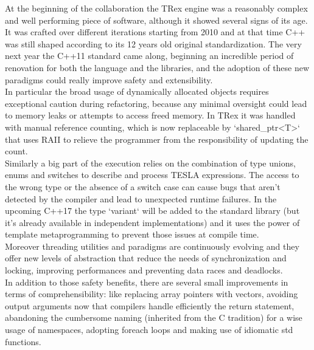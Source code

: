 At the beginning of the collaboration the TRex engine was a reasonably complex and well performing piece of software, although it showed several signs of its age. It was crafted over different iterations starting from 2010 and at that time C++ was still shaped according to its 12 years old original standardization. The very next year the C++11 standard came along, beginning an incredible period of renovation for both the language and the libraries, and the adoption of these new paradigms could really improve safety and extensibility.\\
In particular the broad usage of dynamically allocated objects requires exceptional caution during refactoring, because any minimal oversight could lead to memory leaks or attempts to access freed memory. In TRex it was handled with manual reference counting, which is now replaceable by `shared_ptr<T>` that uses RAII to relieve the programmer from the responsibility of updating the count.\\
Similarly a big part of the execution relies on the combination of type unions, enums and switches to describe and process TESLA expressions. The access to the wrong type or the absence of a switch case can cause bugs that aren't detected by the compiler and lead to unexpected runtime failures. In the upcoming C++17 the type `variant` will be added to the standard library (but it's already available in independent implementations) and it uses the power of template metaprogramming to prevent those issues at compile time.\\
Moreover threading utilities and paradigms are continuously evolving and they offer new levels of abstraction that reduce the needs of synchronization and locking, improving performances and preventing data races and deadlocks.\\
In addition to those safety benefits, there are several small improvements in terms of comprehensibility: like replacing array pointers with vectors, avoiding output arguments now that compilers handle efficiently the return statement, abandoning the cumbersome naming (inherited from the C tradition) for a wise usage of namespaces, adopting foreach loops and making use of idiomatic std functions.

